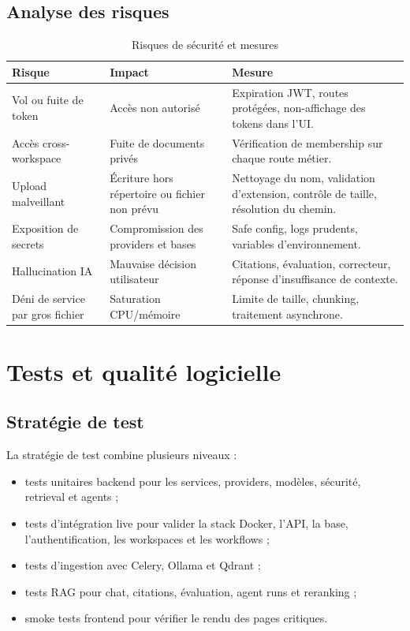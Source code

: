 \documentclass[12pt,a4paper,oneside]{report}
\begin{document}
\section{Analyse des risques}
\begin{table}[H]
  \centering
  \caption{Risques de sécurité et mesures}
  \begin{tabularx}{\textwidth}{L{3.2cm}Y Y}
    \toprule
    \textbf{Risque} & \textbf{Impact} & \textbf{Mesure} \\
    \midrule
    Vol ou fuite de token & Accès non autorisé & Expiration JWT, routes protégées, non-affichage des tokens dans l'UI. \\
    Accès cross-workspace & Fuite de documents privés & Vérification de membership sur chaque route métier. \\
    Upload malveillant & Écriture hors répertoire ou fichier non prévu & Nettoyage du nom, validation d'extension, contrôle de taille, résolution du chemin. \\
    Exposition de secrets & Compromission des providers et bases & Safe config, logs prudents, variables d'environnement. \\
    Hallucination IA & Mauvaise décision utilisateur & Citations, évaluation, correcteur, réponse d'insuffisance de contexte. \\
    Déni de service par gros fichier & Saturation CPU/mémoire & Limite de taille, chunking, traitement asynchrone. \\
    \bottomrule
  \end{tabularx}
\end{table}

\chapter{Tests et qualité logicielle}

\section{Stratégie de test}
La stratégie de test combine plusieurs niveaux :
\begin{itemize}
  \item tests unitaires backend pour les services, providers, modèles, sécurité, retrieval et agents ;
  \item tests d'intégration live pour valider la stack Docker, l'API, la base, l'authentification, les workspaces et les workflows ;
  \item tests d'ingestion avec Celery, Ollama et Qdrant ;
  \item tests RAG pour chat, citations, évaluation, agent runs et reranking ;
  \item smoke tests frontend pour vérifier le rendu des pages critiques.
\end{itemize}
\end{document}

